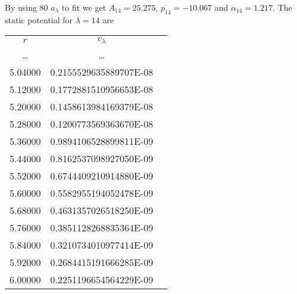 \documentclass[aps,pra,groupedaddress,
                amsfonts,amssymb,
                preprint
    ]{revtex4}
\begin{document}
By using 80 $a_\lambda$ to fit  we get $A_{14} = 25.275$,
$p_{14} = -10.067$ and $\alpha_{14} = 1.217$. The static potential for
$\lambda = 14$ are
\begin{center}
\begin{tabular}{ccc}
     $r$   &    $v_\lambda$ \\
   \ldots  &  \ldots               \\
   5.04000 &   \quad 0.2155529635889707E-08 \\
   5.12000 &   \quad 0.1772881510956653E-08 \\
   5.20000 &   \quad 0.1458613984169379E-08 \\
   5.28000 &   \quad 0.1200773569363670E-08 \\
   5.36000 &   \quad 0.9894106528899811E-09 \\
   5.44000 &   \quad 0.8162537098927050E-09 \\
   5.52000 &   \quad 0.6744409210914880E-09 \\
   5.60000 &   \quad 0.5582955194052478E-09 \\
   5.68000 &   \quad 0.4631357026518250E-09 \\
   5.76000 &   \quad 0.3851128268835364E-09 \\
   5.84000 &   \quad 0.3210734010977414E-09 \\
   5.92000 &   \quad 0.2684415191666285E-09 \\
   6.00000 &   \quad 0.2251196654564229E-09
\end{tabular}
\end{center}
\end{document}
